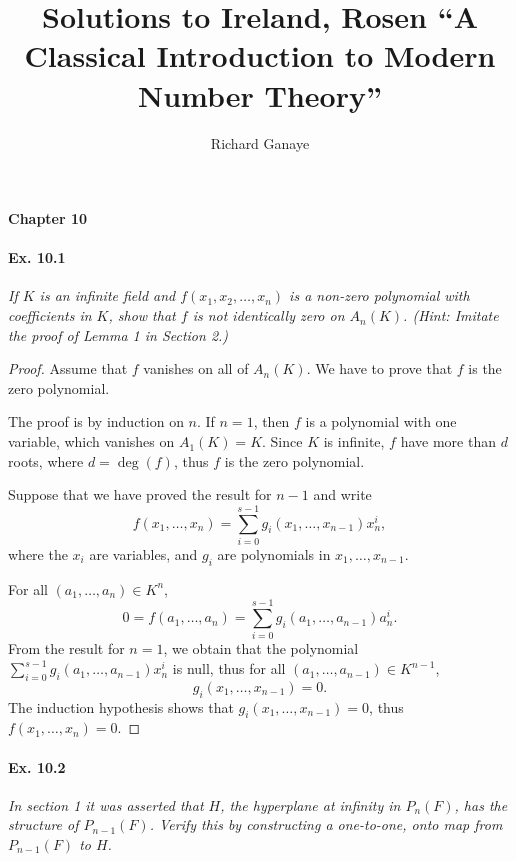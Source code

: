 \documentclass[11pt,a4paper]{article}
\title{Solutions to Ireland, Rosen ``A Classical Introduction to Modern Number Theory''}
\author{Richard Ganaye}
\begin{document}
{ \Large \bf Chapter 10} 

\paragraph{Ex. 10.1}

{\it If $K$ is an infinite field and $f(x_1,x_2,\ldots,x_n)$ is a non-zero polynomial with coefficients in $K$, show that $f$ is not identically zero on $A_n(K)$. (Hint: Imitate the proof of Lemma 1 in Section 2.)
}

\begin{proof}
Assume that $f$ vanishes on all of $A_n(K)$. We have to prove that $f$ is the zero polynomial.

The proof is by induction on $n$. If $n=1$, then $f$ is a polynomial with one variable, which vanishes on $A_1(K) = K$. Since $K$ is infinite, $f$ have more than $d$ roots, where $d = \deg(f)$, thus $f$ is the zero polynomial.

Suppose that we have proved the result for $n-1$ and write
$$f(x_1,\ldots,x_n) = \sum_{i=0}^{s-1} g_i(x_1,\ldots,x_{n-1}) x_n^i,$$
where the $x_i$ are variables, and $g_i$ are polynomials in $x_1,\ldots,x_{n-1}$.

For all $(a_1,\ldots,a_n) \in K^n$, 
$$0 = f(a_1,\ldots,a_n) = \sum_{i=0}^{s-1} g_i(a_1,\ldots,a_{n-1}) a_n^i.$$
From the result for $n=1$, we obtain that the polynomial $ \sum_{i=0}^{s-1} g_i(a_1,\ldots,a_{n-1}) x_n^i$ is null, thus for all $(a_1,\ldots,a_{n-1}) \in K^{n-1}$,
$$ g_i(x_1,\ldots,x_{n-1}) = 0.$$
The induction hypothesis shows that $ g_i(x_1,\ldots,x_{n-1}) = 0$, thus $f(x_1,\ldots,x_n) = 0$.
\end{proof}

\paragraph{Ex. 10.2}
{\it In section 1 it was asserted that $H$, the hyperplane at infinity in $P_n(F)$, has the structure of $P_{n-1}(F)$. Verify this by constructing a one-to-one, onto map from $P_{n-1}(F)$ to $H$.}
\end{document}
